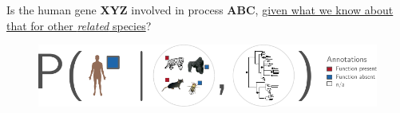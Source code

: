 \documentclass[10pt,aspectratio=169]{beamer}
\newcounter{frame}[frame]
\begin{document}
\begin{frame}[c,label=aphylo-prob-diagram]
	\begin{center}
		\normalsize Is the human gene \textbf{XYZ} involved in process \textbf{ABC}, \uline{given what we know about that for other \textit{related} species}?
	\end{center}
	
	\begin{figure}
		\includegraphics[width=.9\linewidth]{aphylo-data-probability.pdf}
	\end{figure}


\end{frame}
\end{document}
